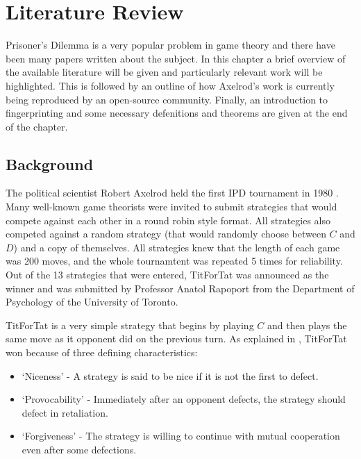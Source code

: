 
\chapter{Literature Review}\label{cha:literature_review}

Prisoner's Dilemma is a very popular problem in game theory and there have been many papers written about the subject.
In this chapter a brief overview of the available literature will be given and particularly relevant work will be highlighted.
This is followed by an outline of how Axelrod's work is currently being reproduced by an open-source community.
Finally, an introduction to fingerprinting and some necessary defenitions and theorems are given at the end of the chapter.


\section{Background}\label{sec:axelrodoriginal}

The political scientist Robert Axelrod held the first IPD tournament in 1980 \cite{Axelrod1980a}.
Many well-known game theorists were invited to submit strategies that would compete against each other in a round robin style format.
All strategies also competed against a random strategy (that would randomly choose between $C$ and $D$) and a copy of themselves.
All strategies knew that the length of each game was 200 moves, and the whole tournamtent was repeated 5 times for reliability.
Out of the 13 strategies that were entered, TitForTat was announced as the winner and was submitted by Professor Anatol Rapoport from the Department of Psychology of the University of Toronto.

TitForTat is a very simple strategy that begins by playing $C$ and then plays the same move as it opponent did on the previous turn.
As explained in \cite{Axelrod1980b}, TitForTat won because of three defining characteristics:

\begin{itemize}
    \item `Niceness' - A strategy is said to be nice if it is not the first to defect.
    \item `Provocability' - Immediately after an opponent defects, the strategy should defect in retaliation.
    \item `Forgiveness' - The strategy is willing to continue with mutual cooperation even after some defections.
\end{itemize}

